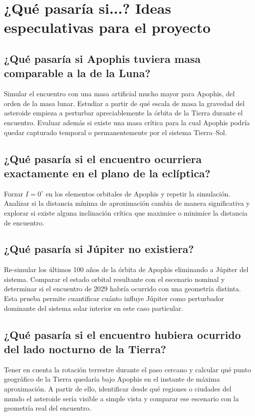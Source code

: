 \section{¿Qué pasaría si...? Ideas especulativas para el proyecto}

\subsection{¿Qué pasaría si Apophis tuviera masa comparable a la de la Luna?}

Simular el encuentro con una masa artificial mucho mayor para Apophis, del orden de la masa lunar. Estudiar a partir de qué escala de masa la gravedad del asteroide empieza a perturbar apreciablemente la órbita de la Tierra durante el encuentro. Evaluar además si existe una masa crítica para la cual Apophis podría quedar capturado temporal o permanentemente por el sistema Tierra--Sol.

\subsection{¿Qué pasaría si el encuentro ocurriera exactamente en el plano de la eclíptica?}

Forzar $I = 0^{\circ}$ en los elementos orbitales de Apophis y repetir la simulación. Analizar si la distancia mínima de aproximación cambia de manera significativa y explorar si existe alguna inclinación crítica que maximice o minimice la distancia de encuentro.

\subsection{¿Qué pasaría si Júpiter no existiera?}

Re-simular los últimos 100 años de la órbita de Apophis eliminando a Júpiter del sistema. Comparar el estado orbital resultante con el escenario nominal y determinar si el encuentro de 2029 habría ocurrido con una geometría distinta. Esta prueba permite cuantificar cuánto influye Júpiter como perturbador dominante del sistema solar interior en este caso particular.

\subsection{¿Qué pasaría si el encuentro hubiera ocurrido del lado nocturno de la Tierra?}

Tener en cuenta la rotación terrestre durante el paso cercano y calcular qué punto geográfico de la Tierra quedaría bajo Apophis en el instante de máxima aproximación. A partir de ello, identificar desde qué regiones o ciudades del mundo el asteroide sería visible a simple vista y comparar ese escenario con la geometría real del encuentro.

